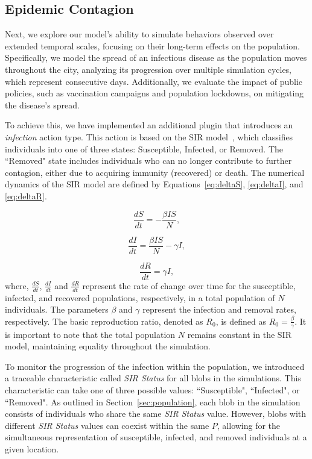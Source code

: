 \documentclass[pdflatex,sn-mathphys-num]{sn-jnl}%
\theoremstyle{thmstyleone}%
\theoremstyle{thmstyletwo}%
\theoremstyle{thmstylethree}%
\begin{document}
\subsection{Epidemic Contagion}
\label{sec:contagion}

Next, we explore our model's ability to simulate behaviors observed over extended temporal scales, focusing on their long-term effects on the population. Specifically, we model the spread of an infectious disease as the population moves throughout the city, analyzing its progression over multiple simulation cycles, which represent consecutive days. Additionally, we evaluate the impact of public policies, such as vaccination campaigns and population lockdowns, on mitigating the disease's spread.

To achieve this, we have implemented an additional plugin that introduces an \textit{infection} action type. This action is based on the SIR model~\citep{kermack1927contribution}, which classifies individuals into one of three states: Susceptible, Infected, or Removed. The ``Removed" state includes individuals who can no longer contribute to further contagion, either due to acquiring immunity (recovered) or death. The numerical dynamics of the SIR model are defined by Equations~\ref{eq:deltaS}, \ref{eq:deltaI}, and \ref{eq:deltaR}.

\begin{equation}
\label{eq:deltaS}
   { \frac{dS}{dt} } =- { \frac{\beta I S}{N} },
\end{equation}

\begin{equation}
\label{eq:deltaI}
   { \frac{dI}{dt} } = { \frac{\beta I S}{N} } - {\gamma I},
\end{equation}

\begin{equation}
\label{eq:deltaR}
   { \frac{dR}{dt} } = {\gamma I},
\end{equation}
where, $\frac{dS}{dt}$, $\frac{dI}{dt}$ and $\frac{dR}{dt}$ represent the rate of change over time for the susceptible, infected, and recovered populations, respectively, in a total population of $N$ individuals. The parameters $\beta$ and $\gamma$ represent the infection and removal rates, respectively. The basic reproduction ratio, denoted as $R_0$, is defined as $R_0 = {\frac{\beta}{\gamma}}$. It is important to note that the total population $N$ remains constant in the SIR model, maintaining equality throughout the simulation.

To monitor the progression of the infection within the population, we introduced a traceable characteristic called \textit{SIR Status} for all blobs in the simulations. This characteristic can take one of three possible values: ``Susceptible", ``Infected", or ``Removed". As outlined in Section~\ref{sec:population}, each blob in the simulation consists of individuals who share the same \textit{SIR Status} value. However, blobs with different \textit{SIR Status} values can coexist within the same $P$, allowing for the simultaneous representation of susceptible, infected, and removed individuals at a given location.
\end{document}
